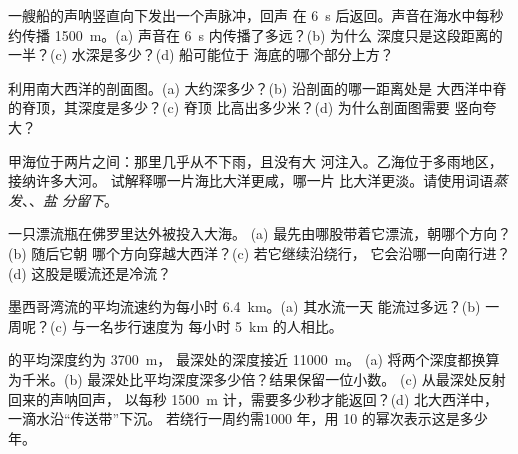 \begin{exercise}[$\star\star$]\label{exo:g8:the-oceans:6}
一艘船的声呐竖直向下发出一个声脉冲，回声
在 \qty{6}{s} 后返回。声音在海水中每秒约传播
\qty{1500}{m}。(a) 声音在 \qty{6}{s} 内传播了多远？(b) 为什么
深度只是这段距离的一半？(c) 水深是多少？(d) 船可能位于
海底的哪个部分上方？
\end{exercise}

\begin{exercise}[$\star\star$]\label{exo:g8:the-oceans:7}
利用南大西洋的剖面图。(a) 大约深多少？(b) 沿剖面的哪一距离处是
大西洋中脊的脊顶，其深度是多少？(c) 脊顶
比高出多少米？(d) 为什么剖面图需要
竖向夸大？
\end{exercise}

\begin{exercise}[$\star\star$]\label{exo:g8:the-oceans:8}
甲海位于两片之间：那里几乎从不下雨，且没有大
河注入。乙海位于多雨地区，接纳许多大河。
试解释哪一片海比大洋更咸，哪一片
比大洋更淡。请使用词语\emph{蒸发}、\emph{}、\emph{盐
分留下}。
\end{exercise}

\begin{exercise}[$\star\star$]\label{exo:g8:the-oceans:9}
一只漂流瓶在佛罗里达外被投入大海。
(a) 最先由哪股带着它漂流，朝哪个方向？(b) 随后它朝
哪个方向穿越大西洋？(c) 若它继续沿绕行，
它会沿哪一向南行进？(d) 这股是暖流还是冷流？
\end{exercise}

\begin{exercise}[$\star\star$]\label{exo:g8:the-oceans:10}
墨西哥湾流的平均流速约为每小时 \qty{6.4}{km}。(a) 其水流一天
能流过多远？(b) 一周呢？(c) 与一名步行速度为
每小时 \qty{5}{km} 的人相比。
\end{exercise}

\begin{exercise}[$\star\star\star$]\label{exo:g8:the-oceans:11}
的平均深度约为 \qty{3700}{m}，
最深处的深度接近 \qty{11000}{m}。
(a) 将两个深度都换算为千米。(b) 最深处比平均深度深多少倍？结果保留一位小数。
(c) 从最深处反射回来的声呐回声，
以每秒 \qty{1500}{m} 计，需要多少秒才能返回？(d) 北大西洋中，
一滴水沿“传送带”下沉。
若绕行一周约需\num{1000} 年，用 10 的幂次表示这是多少年。
\end{exercise}

